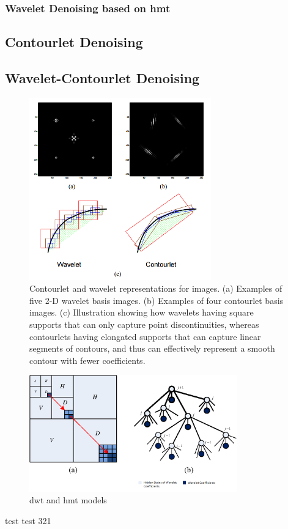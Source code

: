 \subsubsection*{Wavelet Denoising based on \glsdesc{hmt} }


\subsection{Contourlet Denoising}
\cite{po2003directional}

\subsection{Wavelet-Contourlet Denoising}

\begin{figure}[h]
	\centering
	\includegraphics[width=0.7\textwidth]{fig/wavelets_contourlet}
	\caption{Contourlet and wavelet representations for images. (a) Examples of
		five 2-D wavelet basis images. (b) Examples of four contourlet basis images.
		(c) Illustration showing how wavelets having square supports that can only
		capture point discontinuities, whereas contourlets having elongated supports
		that can capture linear segments of contours, and thus can effectively represent
		a smooth contour with fewer coefficients.
		}
	\label{fig:wavelets_contourlet}
\end{figure}


\begin{figure}[h]
	\centering
	\includegraphics[width=0.8\textwidth]{fig/wavelets_hmt}
	\caption{\glsdesc{dwt} and \glsdesc{hmt} models}
	\label{fig:wavelets_hmt}
\end{figure}


test test 321